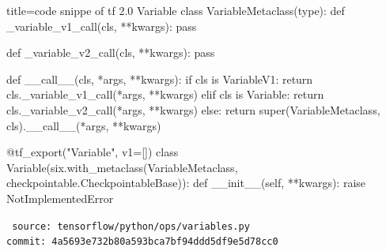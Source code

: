 \begin{frame}[fragile]
    \begin{tcblisting}{title=code snippe of tf 2.0 Variable}
            class VariableMetaclass(type):
              def _variable_v1_call(cls, **kwargs):
                pass

              def _variable_v2_call(cls, **kwargs):
                pass

              def __call__(cls, *args, **kwargs):
                if cls is VariableV1:
                  return cls._variable_v1_call(*args, **kwargs)
                elif cls is Variable:
                  return cls._variable_v2_call(*args, **kwargs)
                else:
                  return super(VariableMetaclass, cls).__call__(*args, **kwargs)

            @tf_export("Variable", v1=[])
            class Variable(six.with_metaclass(VariableMetaclass,
                                              checkpointable.CheckpointableBase)):
              def __init__(self, **kwargs):
                raise NotImplementedError
    \end{tcblisting}
    {\tiny \tt
    source: tensorflow/python/ops/variables.py \\[-2ex]
    commit: 4a5693e732b80a593bca7bf94ddd5df9e5d78cc0}
\end{frame}
